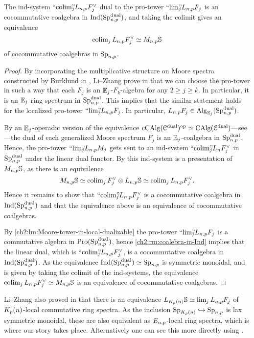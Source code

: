 \begin{lemma}
    \label{ch2:lm:coalgebra-ind-presentation-of-monochromatic-sphere}
    The ind-system $``\!\operatorname{colim}\!"_{\hspace{-5pt} j} L_{n,p} F_j^\vee$ dual to the pro-tower $``\!\lim\!"_{\hspace{-5pt} j} L_{n,p} F_j$ is an cocommutative coalgebra in $\operatorname{Ind}(\mathrm{Sp}_{n,p}^{\mathrm{dual}})$, and taking the colimit gives an equivalence 
    \[\operatorname{colim}_j L_{n,p} F_j^\vee \simeq M_{n,p}\mathbb{S}\] 
    of cocommutative coalgebras in $\mathrm{Sp}_{n,p}$. 
\end{lemma}
\begin{proof}
    By incorporating the multiplicative structure on Moore spectra constructed by Burklund in \cite{burklund_2022}, Li--Zhang prove in \cite[2.1.4]{li-zhang_2023} that we can choose the pro-tower in such a way that each $F_j$ is an $\mathbb{E}_j$-$F_k$-algebra for any $2\geq j \geq k$. In particular, it is an $\mathbb{E}_j$-ring spectrum in $\mathrm{Sp}_{n,p}^{\mathrm{dual}}$. This implies that the similar statement holds for the localized pro-tower $``\!\lim\!"_{\hspace{-5pt} j} L_{n,p} F_j$. In particular, $L_{n,p} F_j \in \operatorname{Alg}_{\mathbb{E}_j}(\mathrm{Sp}_{n,p}^{\mathrm{dual}})$. 
    
    By an $\mathbb{E}_j$-operadic version of the equivalence $\operatorname{cCAlg}(\EuScript{C}^{\mathrm{dual}})^{\mathrm{op}}\simeq \operatorname{CAlg}(\EuScript{C}^{\mathrm{dual}})$---see \cite[3.5]{peroux_2022}---the dual of each generalized Moore spectrum $F_j$ is an $\mathbb{E}_j$-coalgebra in $\mathrm{Sp}_{n,p}^{\mathrm{dual}}$. Hence, the pro-tower $``\!\lim\!"_{\hspace{-5pt} j} L_{n,p} M_j$ gets sent to an ind-system $``\!\operatorname{colim}\!"_{\hspace{-5pt} j} L_n F_j^\vee$ in $\mathrm{Sp}_{n,p}^{\mathrm{dual}}$ under the linear dual functor. By \cite[7.10(c)]{hovey-strickland_99} this ind-system is a presentation of $M_{n,p}\mathbb{S}$, as there is an equivalence 
    \[M_{n,p} \mathbb{S} \simeq \operatorname{colim}_j F_j^\vee \otimes L_{n,p}\mathbb{S} \simeq \operatorname{colim}_j L_{n,p} F_j^\vee.\]
    Hence it remains to show that $``\!\operatorname{colim}\!"_{\hspace{-5pt} j} L_{n,p} F_j^\vee$ is a cocommutative coalgebra in $\operatorname{Ind}(\mathrm{Sp}_{n,p}^{\mathrm{dual}})$ and that the equivalence above is an equivalence of cocommutative coalgebras. 

    By \cref{ch2:lm:Moore-tower-in-local-dualizable} the pro-tower $``\!\lim\!"_{\hspace{-5pt} j} L_{n,p} F_j$ is a commutative algebra in $\operatorname{Pro}(\mathrm{Sp}_{n,p}^{\mathrm{dual}})$, hence \cref{ch2:rm:coalebra-in-Ind} implies that the linear dual, which is $``\!\operatorname{colim}\!"_{\hspace{-5pt} j} L_{n,p} F_j^\vee$, is a cocommutative coalgebra in $\operatorname{Ind}(\mathrm{Sp}_{n,p}^{\mathrm{dual}})$. As the equivalence $\operatorname{Ind}(\mathrm{Sp}_{n,p}^{\mathrm{dual}})\simeq \mathrm{Sp}_{n,p}$ is symmetric monoidal, and is given by taking the colimit of the ind-systems, the equivalence $\operatorname{colim}_j L_{n,p} F_j^\vee \simeq M_{n,p} \mathbb{S}$ is an equivalence of cocommutative coalgebras.  
\end{proof}

\begin{remark}
    Li--Zhang also proved in \cite[2.1.5]{li-zhang_2023} that there is an equivalence $L_{K_p(n)}\mathbb{S} \simeq \lim_j L_{n,p} F_j$ of ${K_p(n)}$-local commutative ring spectra. As the inclusion $\mathrm{Sp}_{{K_p(n)}}\hookrightarrow \mathrm{Sp}_{n,p}$ is lax symmetric monoidal, these are also equivalent as $E_{n,p}$-local ring spectra, which is where our story takes place. Alternatively one can see this more directly using \cite[2.1.6]{li-zhang_2023}. 
\end{remark}

